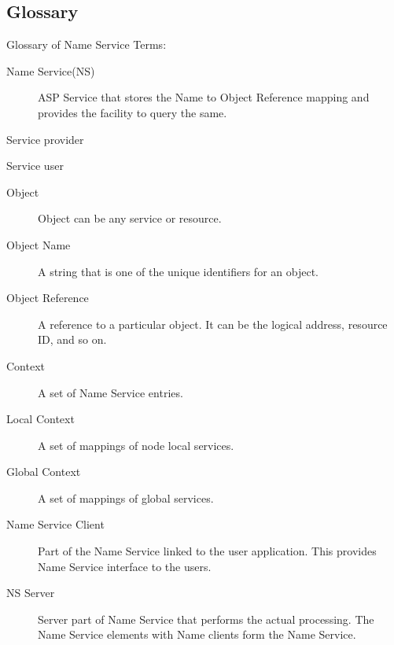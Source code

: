 \begin{flushleft}
\chapter*{Glossary}
\begin{Desc}
\item[Glossary of Name Service Terms:]
\begin{description}
\item[Name Service(NS)] ASP Service that stores the Name to Object Reference mapping and provides the facility to query the same.
\end{description}
\begin{description}
\item[Service provider]
\end{description}
\begin{description}
\item[Service user]
\end{description}
\begin{description}
\item[Object] Object can be any service or resource. 
\end{description}
\begin{description}
\item[Object Name] A string that is one of the unique identifiers for an object.
\end{description}
\begin{description}
\item[Object Reference] A reference to a particular object. It can be the logical address, resource ID, and so on.
\end{description}
\begin{description}
\item[Context] A set of Name Service entries.
\end{description}
\begin{description}
\item[Local Context] A set of mappings of node local services. 
\end{description}
\begin{description}
\item[Global Context] A set of mappings of global services. 
\end{description}
\begin{description}
\item[Name Service Client] Part of the Name Service linked to the user application. This provides Name Service interface to the users.
\end{description}
\begin{description}
\item[NS Server] Server part of Name Service that performs the actual processing. The Name Service elements with Name clients form the Name 
Service. 
\end{description}
\end{Desc}

\end{flushleft}